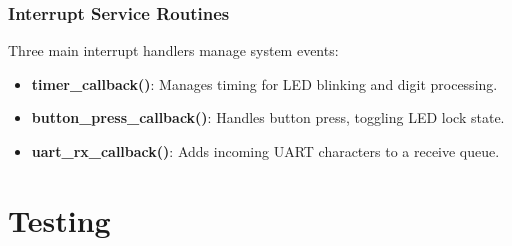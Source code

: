 \documentclass[12pt,a4paper]{article}
\begin{document}
\vspace{2mm}

\subsubsection{Interrupt Service Routines}
Three main interrupt handlers manage system events:

\begin{tcolorbox}[mybox]
\begin{itemize}[label=\textcolor{myblue}{$\blacktriangleright$}, itemsep=1.5mm]
    \item \textbf{timer\_callback()}: Manages timing for LED blinking and digit processing.
    \item \textbf{button\_press\_callback()}: Handles button press, toggling LED lock state.
    \item \textbf{uart\_rx\_callback()}: Adds incoming UART characters to a receive queue.
\end{itemize}
\end{tcolorbox}

\section{Testing}
\end{document}
